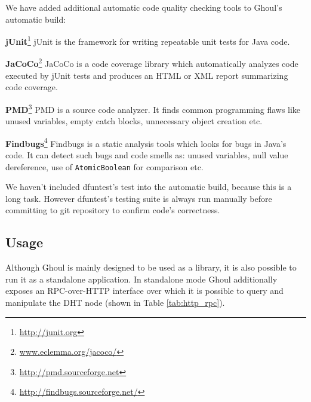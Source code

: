 We have added additional automatic code quality checking tools to Ghoul's automatic build:

\begin{description}
  \item{\textbf{jUnit}\footnote{\url{http://junit.org}}}
    jUnit is the framework for writing repeatable unit tests for Java code.
  \item{\textbf{JaCoCo}\footnote{\url{www.eclemma.org/jacoco/}}}
    JaCoCo is a code coverage library which automatically analyzes code executed by jUnit tests and produces an HTML or XML report summarizing code coverage.

  \item{\textbf{PMD}\footnote{\url{http://pmd.sourceforge.net}}}
    PMD is a source code analyzer.
    It finds common programming flaws like unused variables, empty catch blocks, unnecessary object creation etc.
  \item{\textbf{Findbugs}\footnote{\url{http://findbugs.sourceforge.net/}}}
    Findbugs is a static analysis tools which looks for bugs in Java's code.
    It can detect such bugs and code smells as: unused variables, null value
    dereference, use of \texttt{AtomicBoolean} for comparison etc.

\end{description}

We haven't included dfuntest's test into the automatic build, because this is a
long task.
However dfuntest's testing suite is always run manually before committing to git
repository to confirm code's correctness.

\subsection{Usage}

Although Ghoul is mainly designed to be used as a library, it is also possible
to run it as a standalone application.
In standalone mode Ghoul additionally exposes an RPC-over-HTTP interface over
which it is possible to query and manipulate the DHT node (shown in Table
\ref{tab:http_rpc}).

